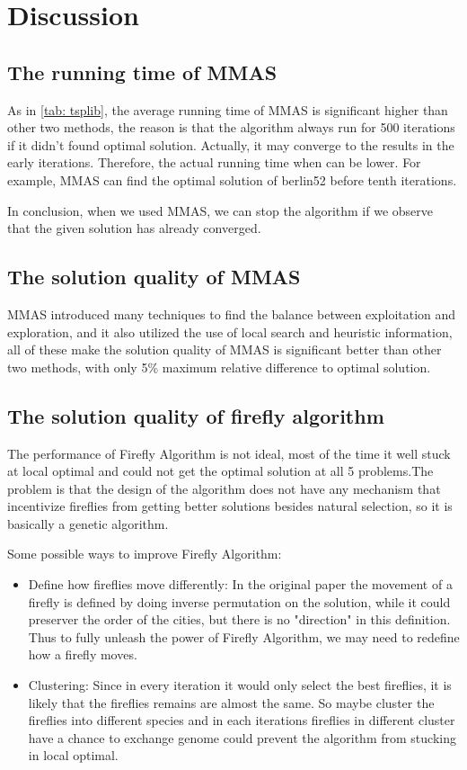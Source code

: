 \documentclass[twocolumn, a4paper]{extarticle}
\begin{document}
\section{Discussion}

\subsection{The running time of MMAS}

As in \autoref{tab: tsplib}, the average running time of MMAS is significant higher than other two methods, the reason is that the algorithm always run for 500 iterations if it didn't found optimal solution. Actually, it may converge to the results in the early iterations. Therefore, the actual running time when can be lower. For example, MMAS can find the optimal solution of berlin52 before tenth iterations.

In conclusion, when we used MMAS, we can stop the algorithm if we observe that the given solution has already converged.


\subsection{The solution quality of MMAS}

MMAS introduced many techniques to find the balance between exploitation and exploration, and it also utilized the use of local search and heuristic information, all of these make the solution quality of MMAS is significant better than other two methods, with only 5\% maximum relative difference to optimal solution.

\subsection{The solution quality of firefly algorithm}

The performance of Firefly Algorithm is not ideal, most of the time it well stuck at local optimal and could not get the optimal solution at all 5 problems.The problem is that the design of the algorithm does not have any mechanism that incentivize fireflies from getting better solutions besides natural selection, so it is basically a genetic algorithm.

Some possible ways to improve Firefly Algorithm:

\begin{itemize}
	\item Define how fireflies move differently: In the original paper the movement of a firefly is defined by doing inverse permutation on the solution, while it could preserver the order of the cities, but there is no "direction" in this definition. Thus to fully unleash the power of Firefly Algorithm, we may need to redefine how a firefly moves.
	\item Clustering: Since in every iteration it would only select the best fireflies, it is likely that the fireflies remains are almost the same. So maybe cluster the fireflies into different species and in each iterations fireflies in different cluster have a chance to exchange genome could prevent the algorithm from stucking in local optimal.
\end{itemize}
\end{document}
